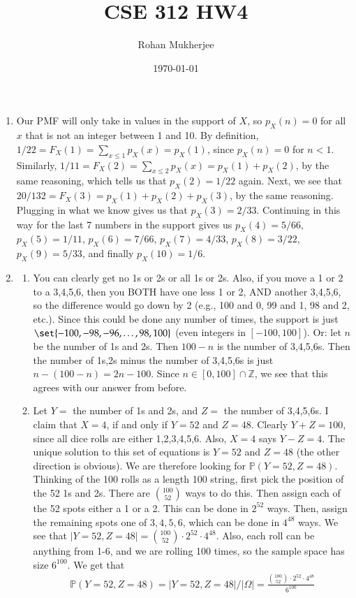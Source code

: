 \documentclass[12pt]{article}
\title{CSE 312 HW4}
\date{\today}
\author{Rohan Mukherjee}
\def\mbb#1{\mathbb{#1}}
\def\bZ{\mbb{Z}}
\renewcommand{\P}{\mathbb{P}}
\theoremstyle{definition}
\theoremstyle{remark}
\begin{document}
	\maketitle
	\begin{enumerate}[leftmargin=\labelsep]
		\item Our PMF will only take in values in the support of $X$, so $p_X(n) = 0$ for all $x$ that is not an integer between 1 and 10. By definition, $1/22=F_X(1) = \sum_{x \leq 1} p_X(x) = p_X(1)$, since $p_X(n) = 0$ for $n < 1$. Similarly, $1/11=F_X(2) = \sum_{x \leq 2} p_X(x) = p_X(1) + p_X(2)$, by the same reasoning, which tells us that $p_X(2) = 1/22$ again. Next, we see that $20/132=F_X(3) = p_X(1) + p_X(2) + p_X(3)$, by the same reasoning. Plugging in what we know gives us that $p_X(3) = 2/33$. Continuing in this way for the last 7 numbers in the support gives us $p_X(4) = 5/66$, $p_X(5) = 1/11$, $p_X(6) = 7/66$, $p_X(7) = 4/33$, $p_X(8)=3/22$, $p_X(9)=5/33$, and finally $p_X(10)=1/6$.
	
		\newpage
		\item \begin{enumerate}
			\item You can clearly get no 1s or 2s or all 1s or 2s. Also, if you move a 1 or 2 to a 3,4,5,6, then you BOTH have one less 1 or 2, AND another 3,4,5,6, so the difference would go down by 2 (e.g., 100 and 0, 99 and 1, 98 and 2, etc.). Since this could be done any number of times, the support is just $\set{-100, -98, -96, \ldots, 98, 100}$ (even integers in $[-100, 100]$). Or: let $n$ be the number of 1s and 2s. Then $100-n$ is the number of 3,4,5,6s. Then the number of 1s,2s minus the number of 3,4,5,6s is just $n-(100-n) = 2n-100$. Since $n \in [0, 100] \cap \bZ$, we see that this agrees with our answer from before.
			
			\item Let $Y = $ the number of 1s and 2s, and $Z = $ the number of 3,4,5,6s. I claim that $X = 4$, if and only if $Y=52$ and $Z = 48$. Clearly $Y + Z = 100$, since all dice rolls are either 1,2,3,4,5,6. Also, $X = 4$ says $Y-Z = 4$. The unique solution to this set of equations is $Y=52$ and $Z=48$ (the other direction is obvious). We are therefore looking for $\P(Y=52, Z=48)$. Thinking of the 100 rolls as a length 100 string, first pick the position of the 52 1s and 2s. There are ${100 \choose 52}$ ways to do this. Then assign each of the 52 spots either a 1 or a 2. This can be done in $2^{52}$ ways. Then, assign the remaining spots one of $3,4,5,6$, which can be done in $4^{48}$ ways. We see that $|Y=52, Z=48| = {100 \choose 52} \cdot 2^{52} \cdot 4^{48}$. Also, each roll can be anything from 1-6, and we are rolling 100 times, so the sample space has size $6^{100}$. We get that 
			\begin{align*}
				\P(Y=52, Z=48) = |Y=52, Z=48|/|\Omega| = \frac{{100 \choose 52} \cdot 2^{52} \cdot 4^{48}}{6^{100}}
			\end{align*}
		\end{enumerate}
	

\end{enumerate}
\end{document}

